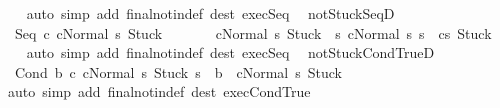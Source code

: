 \begin{isabellebody}
%
\isadelimproof
\ \ %
\endisadelimproof
%
\isatagproof
{}\isamarkupfalse%
\ {\isacharparenleft}auto\ simp\ add{\isacharcolon}\ final{\isacharunderscore}notin{\isacharunderscore}def\ dest{\isacharcolon}\ exec{\isachardot}Seq\ {\isacharparenright}%
\endisatagproof
{\isafoldproof}%
%
\isadelimproof
\isanewline
%
\endisadelimproof
\isanewline
{}\isamarkupfalse%
\ notStuck{\isacharunderscore}SeqD{\isacharcolon}\ \isanewline
\ \ {\isachardoublequoteopen}{\isasymlbrakk}{\isasymGamma}{\isasymturnstile}{\isasymlangle}Seq\ c{}\ c{}{\isacharcomma}Normal\ s{\isasymrangle}\ {\isasymRightarrow}{\isasymnotin}{\isacharbraceleft}Stuck{\isacharbraceright}{\isasymrbrakk}\ {\isasymLongrightarrow}\ \isanewline
\ \ \ \ \ {\isasymGamma}{\isasymturnstile}{\isasymlangle}c{}{\isacharcomma}Normal\ s{\isasymrangle}\ {\isasymRightarrow}{\isasymnotin}{\isacharbraceleft}Stuck{\isacharbraceright}\ {\isasymand}\ {\isacharparenleft}{\isasymforall}s{\isacharprime}{\isachardot}\ {\isasymGamma}{\isasymturnstile}{\isasymlangle}c{}{\isacharcomma}Normal\ s{\isasymrangle}\ {\isasymRightarrow}s{\isacharprime}\ {\isasymlongrightarrow}\ {\isasymGamma}{\isasymturnstile}{\isasymlangle}c{}{\isacharcomma}s{\isacharprime}{\isasymrangle}\ {\isasymRightarrow}{\isasymnotin}{\isacharbraceleft}Stuck{\isacharbraceright}{\isacharparenright}{\isachardoublequoteclose}\isanewline
%
\isadelimproof
\ \ %
\endisadelimproof
%
\isatagproof
{}\isamarkupfalse%
\ {\isacharparenleft}auto\ simp\ add{\isacharcolon}\ final{\isacharunderscore}notin{\isacharunderscore}def\ dest{\isacharcolon}\ exec{\isachardot}Seq\ {\isacharparenright}%
\endisatagproof
{\isafoldproof}%
%
\isadelimproof
\isanewline
%
\endisadelimproof
\isanewline
{}\isamarkupfalse%
\ notStuck{\isacharunderscore}CondTrueD{\isacharcolon}\ \isanewline
\ \ {\isachardoublequoteopen}{\isasymlbrakk}{\isasymGamma}{\isasymturnstile}{\isasymlangle}Cond\ b\ c{}\ c{}{\isacharcomma}Normal\ s{\isasymrangle}\ {\isasymRightarrow}{\isasymnotin}{\isacharbraceleft}Stuck{\isacharbraceright}{\isacharsemicolon}\ s\ {\isasymin}\ b{\isasymrbrakk}\ {\isasymLongrightarrow}\ {\isasymGamma}{\isasymturnstile}{\isasymlangle}c{}{\isacharcomma}Normal\ s{\isasymrangle}\ {\isasymRightarrow}{\isasymnotin}{\isacharbraceleft}Stuck{\isacharbraceright}{\isachardoublequoteclose}\isanewline
%
\isadelimproof
\ \ %
\endisadelimproof
%
\isatagproof
{}\isamarkupfalse%
\ {\isacharparenleft}auto\ simp\ add{\isacharcolon}\ final{\isacharunderscore}notin{\isacharunderscore}def\ dest{\isacharcolon}\ exec{\isachardot}CondTrue{\isacharparenright}%

\end{isabellebody}
